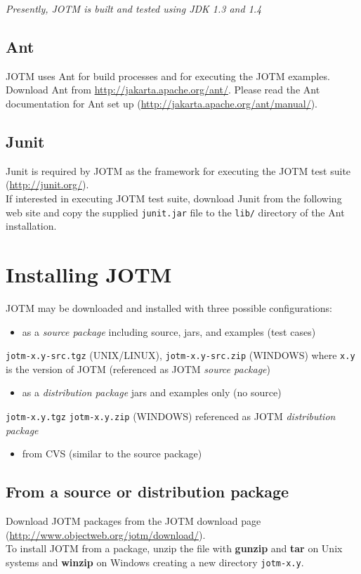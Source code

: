 \documentclass[a4paper,11pt]{article}
\begin{document}
\emph{Presently, JOTM is built and tested using JDK 1.3 and 1.4}
\subsection{Ant}
\label{sec:ant_prereq}
JOTM uses Ant for build processes and for executing the JOTM
examples.\\
Download Ant from \url{http://jakarta.apache.org/ant/}.
Please read the Ant documentation for Ant set up (\url{http://jakarta.apache.org/ant/manual/}).

\subsection{Junit}
\label{sec:junit_prereq}
Junit is required by JOTM as the framework for executing the JOTM
test suite (\url{http://junit.org/}).\\
If interested in executing JOTM test suite, download Junit from the following web site 
and copy the supplied \texttt{junit.jar} file to the \texttt{lib/} directory
 of the Ant installation.

\section{Installing JOTM}
\label{sec:install}
JOTM may be downloaded and installed with three possible configurations:
\begin{itemize}
\item as a \emph{source package} including source, jars, and examples (test cases)
\end{itemize}

\noindent \texttt{jotm-x.y-src.tgz} (UNIX/LINUX), \texttt{jotm-x.y-src.zip} (WINDOWS)
where \texttt{x.y} is the
 version of JOTM (referenced as JOTM \emph{source package})
\begin{itemize}
\item as a \emph{distribution package} jars and examples only (no source)
\end{itemize}
\texttt{jotm-x.y.tgz} \texttt{jotm-x.y.zip} (WINDOWS) 
referenced as JOTM \emph{distribution package}
\begin{itemize}
\item from CVS (similar to the source package)
\end{itemize}

\subsection{From a source or distribution package}
\label{sec:pack_install}
Download JOTM packages from the JOTM download page
(\url{http://www.objectweb.org/jotm/download/}).\\
To install JOTM from a package, unzip the file with \textbf{gunzip}
and \textbf{tar} on Unix systems and \textbf{winzip} on Windows
 creating a new directory \texttt{jotm-x.y}.
\end{document}
